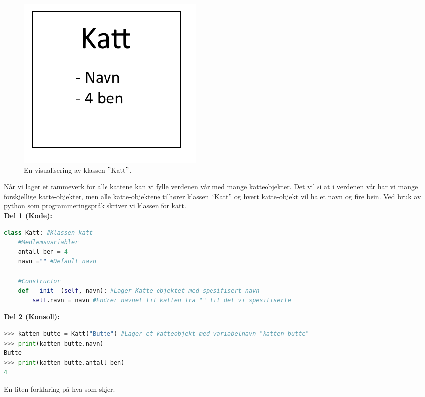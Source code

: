 \begin{figure}[H]
    \centering
    \includegraphics[scale=0.5]{Figures/Klasser_katt.png}
    \caption{En visualisering av klassen $"$Katt$"$.}
    \label{fig:Katte_boks}
\end{figure}

Når vi lager et rammeverk for alle kattene kan vi fylle verdenen vår med mange katteobjekter. Det vil si at i verdenen vår har vi mange forskjellige katte-objekter, men alle katte-objektene tilhører klassen ``Katt'' og hvert katte-objekt vil ha et navn og fire bein. Ved bruk av python som programmeringspråk skriver vi klassen for katt.\\[0.5cm]
\textbf{Del 1 (Kode):}
\begin{lstlisting}[language=python]
class Katt: #Klassen katt
    #Medlemsvariabler
    antall_ben = 4 
    navn ="" #Default navn
    
    #Constructor
    def __init__(self, navn): #Lager Katte-objektet med spesifisert navn
        self.navn = navn #Endrer navnet til katten fra "" til det vi spesifiserte

\end{lstlisting}
\textbf{Del 2 (Konsoll):}
\begin{lstlisting}[language=python]
>>> katten_butte = Katt("Butte") #Lager et katteobjekt med variabelnavn "katten_butte"
>>> print(katten_butte.navn) 
Butte
>>> print(katten_butte.antall_ben) 
4
\end{lstlisting}

En liten forklaring på hva som skjer.

